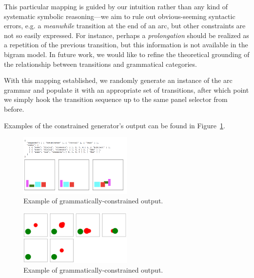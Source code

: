 This particular mapping is guided by our intuition rather than any kind of
systematic symbolic reasoning---we aim to rule out obvious-seeming
syntactic errors, e.g. a \emph{meanwhile} transition at the end of an arc, but
other constraints are not so easily expressed. For instance, perhaps a
\emph{prolongation} should be realized as a repetition of the previous
transition, but this information is not available in the bigram model. In
future work, we would like to refine the theoretical grounding of the
relationship between transitions and grammatical categories.

With this mapping established, we randomly generate an instance of the
arc grammar and populate it with an appropriate set of transitions, after
which point we simply hook the transition sequence up to the same panel
selector from before.

Examples of the constrained generator's output can be found in
Figure~\ref{fig:outgood}.

\begin{figure}
\includegraphics[width=0.5\textwidth]{comicgen-output-constrained-1.png}
\caption{Example of grammatically-constrained output.}
\label{fig:outgood}
\end{figure}

\begin{figure}
\includegraphics[width=0.5\textwidth]{comicgen-output-4.png}
\caption{Example of grammatically-constrained output.}
\label{fig:redgreen}
\end{figure}



